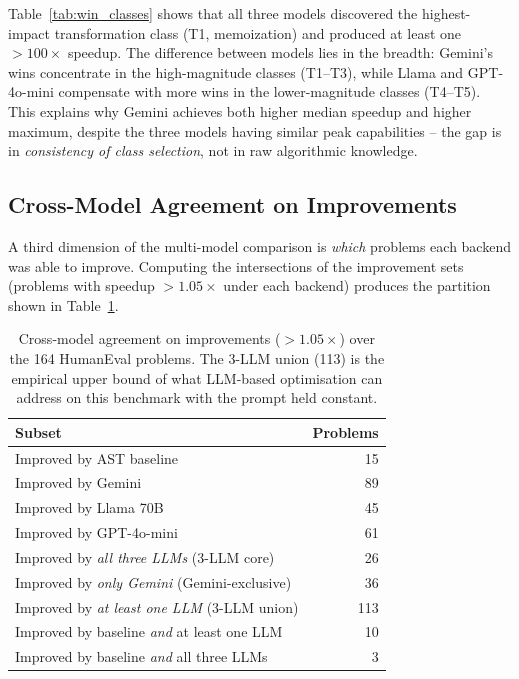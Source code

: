 \documentclass[conference]{IEEEtran}
\begin{document}
Table~\ref{tab:win_classes} shows that all three models discovered the highest-impact transformation class (T1, memoization) and produced at least one $> 100\times$ speedup. The difference between models lies in the breadth: Gemini's wins concentrate in the high-magnitude classes (T1--T3), while Llama and GPT-4o-mini compensate with more wins in the lower-magnitude classes (T4--T5). This explains why Gemini achieves both higher median speedup and higher maximum, despite the three models having similar peak capabilities -- the gap is in \emph{consistency of class selection}, not in raw algorithmic knowledge.

\subsection{Cross-Model Agreement on Improvements}
\label{sec:cross_model}

A third dimension of the multi-model comparison is \emph{which} problems each backend was able to improve. Computing the intersections of the improvement sets (problems with speedup $> 1.05\times$ under each backend) produces the partition shown in Table~\ref{tab:agreement}.

\begin{table}[htbp]
\caption{Cross-model agreement on improvements ($> 1.05\times$) over the 164 HumanEval problems. The 3-LLM union (113) is the empirical upper bound of what LLM-based optimisation can address on this benchmark with the prompt held constant.}
\label{tab:agreement}
\centering
\footnotesize
\begin{tabular}{lr}
\hline
\textbf{Subset} & \textbf{Problems} \\
\hline
Improved by AST baseline & 15 \\
Improved by Gemini & 89 \\
Improved by Llama 70B & 45 \\
Improved by GPT-4o-mini & 61 \\
\hline
Improved by \emph{all three LLMs} (3-LLM core) & 26 \\
Improved by \emph{only Gemini} (Gemini-exclusive) & 36 \\
Improved by \emph{at least one LLM} (3-LLM union) & 113 \\
Improved by baseline \emph{and} at least one LLM & 10 \\
Improved by baseline \emph{and} all three LLMs & 3 \\
\hline
\end{tabular}
\end{table}
\end{document}
